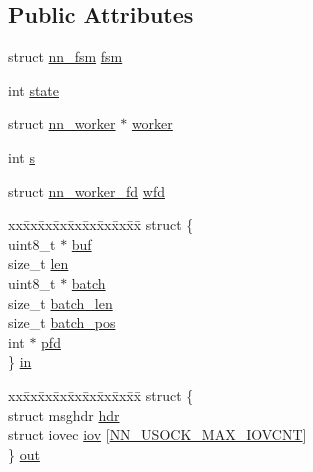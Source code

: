 \subsection*{Public Attributes}
\begin{DoxyCompactItemize}
\item 
struct \hyperlink{structnn__fsm}{nn\+\_\+fsm} \hyperlink{structnn__usock_a98c2a6282c489b65549e456c79dcf765}{fsm}
\item 
int \hyperlink{structnn__usock_a65e9e0f1508a46c242c190b86876097c}{state}
\item 
struct \hyperlink{structnn__worker}{nn\+\_\+worker} $\ast$ \hyperlink{structnn__usock_a1f386fc2676edf4e186d6f675fcf2922}{worker}
\item 
int \hyperlink{structnn__usock_a1ac2b5e168dfe2692a4e311267d1b2da}{s}
\item 
struct \hyperlink{structnn__worker__fd}{nn\+\_\+worker\+\_\+fd} \hyperlink{structnn__usock_a6dcccc01004ab1aed3b65dfdf7741153}{wfd}
\item 
\begin{tabbing}
xx\=xx\=xx\=xx\=xx\=xx\=xx\=xx\=xx\=\kill
struct \{\\
\>uint8\_t $\ast$ \hyperlink{structnn__usock_aaaf0337b5264f225397b58e66d4051da}{buf}\\
\>size\_t \hyperlink{structnn__usock_a470ef4e0625fba9bb7a08cd36518bcc2}{len}\\
\>uint8\_t $\ast$ \hyperlink{structnn__usock_a01aedba472c572ec57a75a2006b4bf10}{batch}\\
\>size\_t \hyperlink{structnn__usock_a17dc918600c0032398e04343c4e15236}{batch\_len}\\
\>size\_t \hyperlink{structnn__usock_ae2d1efe554aafb9c2477cc50258985d3}{batch\_pos}\\
\>int $\ast$ \hyperlink{structnn__usock_a0d1f75385c85309c1a0d730ca3edac4e}{pfd}\\
\} \hyperlink{structnn__usock_acdc3e32ab008621c9abeecca2541e43d}{in}\\

\end{tabbing}\item 
\begin{tabbing}
xx\=xx\=xx\=xx\=xx\=xx\=xx\=xx\=xx\=\kill
struct \{\\
\>struct msghdr \hyperlink{structnn__usock_a6a5703bf0dcb30238361a7490af587cd}{hdr}\\
\>struct iovec \hyperlink{structnn__usock_af63c29b3e11577d914c9c45db9581a66}{iov} \mbox{[}\hyperlink{usock_8h_afcddefc2e9c1f5e8aab8359c24bb58b0}{NN\_USOCK\_MAX\_IOVCNT}\mbox{]}\\
\} \hyperlink{structnn__usock_af4fcf132e39cf53c079b4f8e290eaed1}{out}\\


\end{tabbing}
\end{DoxyCompactItemize}
